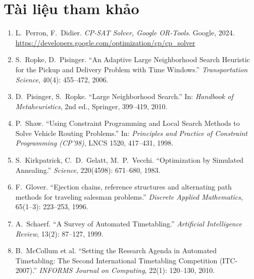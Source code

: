 \section*{Tài liệu tham khảo}

\begin{enumerate}[leftmargin=*, itemsep=3pt]
  \item L.~Perron, F.~Didier. \textit{CP-SAT Solver, Google OR-Tools}. Google,
  2024. \url{https://developers.google.com/optimization/cp/cp_solver}

  \item S.~Ropke, D.~Pisinger. ``An Adaptive Large Neighborhood Search Heuristic
  for the Pickup and Delivery Problem with Time Windows.'' \textit{Transportation
  Science}, 40(4): 455--472, 2006.

  \item D.~Pisinger, S.~Ropke. ``Large Neighborhood Search.'' In: \textit{Handbook
  of Metaheuristics}, 2nd ed., Springer, 399--419, 2010.

  \item P.~Shaw. ``Using Constraint Programming and Local Search Methods to Solve
  Vehicle Routing Problems.'' In: \textit{Principles and Practice of Constraint
  Programming (CP'98)}, LNCS 1520, 417--431, 1998.

  \item S.~Kirkpatrick, C.~D.~Gelatt, M.~P.~Vecchi. ``Optimization by Simulated
  Annealing.'' \textit{Science}, 220(4598): 671--680, 1983.

  \item F.~Glover. ``Ejection chains, reference structures and alternating path
  methods for traveling salesman problems.'' \textit{Discrete Applied Mathematics},
  65(1--3): 223--253, 1996.

  \item A.~Schaerf. ``A Survey of Automated Timetabling.'' \textit{Artificial
  Intelligence Review}, 13(2): 87--127, 1999.

  \item B.~McCollum et al. ``Setting the Research Agenda in Automated Timetabling:
  The Second International Timetabling Competition (ITC-2007).'' \textit{INFORMS
  Journal on Computing}, 22(1): 120--130, 2010.
\end{enumerate}
